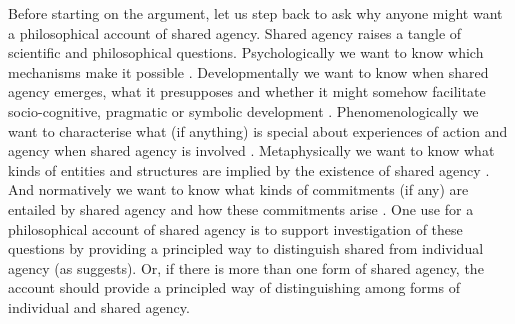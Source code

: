 \documentclass[12pt,\papersize]{extarticle}
\begin{document}

Before starting on the argument, let us step back to ask why anyone might want a philosophical account of shared agency.
Shared agency raises a tangle of scientific and philosophical questions.  Psychologically we want to know which mechanisms make it possible \citep{vesper_minimal_2010}.  
Developmentally we want to know when shared agency emerges, what it presupposes and whether it might somehow facilitate socio-cognitive, pragmatic or symbolic development \citep{Moll:2007gu,Hughes:2004zj,Brownell:2006gu}.  
Phenomenologically we want to characterise what (if anything) is special about experiences of action and agency when shared agency is involved \citep{Pacherie:2010fk}.  
Metaphysically we want to know what kinds of entities and structures are implied by the existence of shared agency \citep{Gilbert:1992rs,Searle:1994lb}.  
And normatively we want to know what kinds of commitments (if any) are entailed by shared agency and how these commitments arise \citep{Roth:2004ki}.
One use for a philosophical account of shared agency is to support investigation of these questions by providing a principled way to distinguish shared from individual agency (as \citealp{Bratman:2009lv} suggests).  
Or, if there is more than one form of shared agency, the account should provide a principled way of distinguishing among forms of individual and shared agency.   
%
\end{document}
